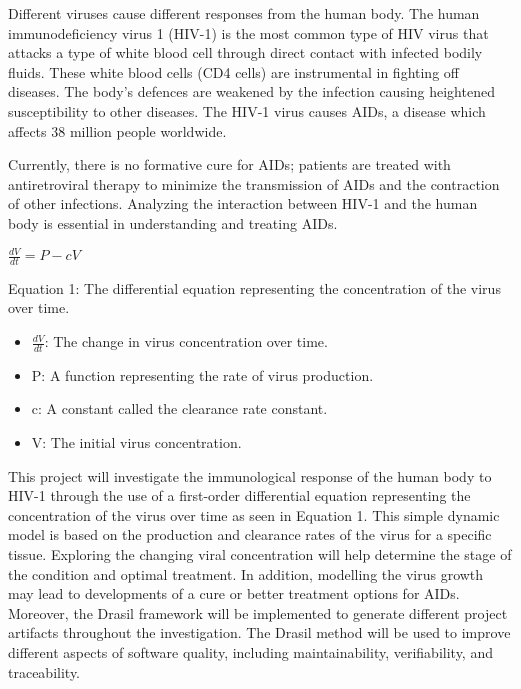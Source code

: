 \documentclass{article}
\begin{document}
Different viruses cause different responses from the human body. The human 
immunodeficiency virus 1 (HIV-1) is the most common type of HIV virus that 
attacks a type of white blood cell through direct contact with infected bodily 
fluids. These white blood cells (CD4 cells) are instrumental in fighting off 
diseases. The body’s defences are weakened by the infection causing heightened 
susceptibility to other diseases. The HIV-1 virus causes AIDs, a disease which 
affects 38 million people worldwide. 

Currently, there is no formative cure for AIDs; patients are treated with 
antiretroviral therapy to minimize the transmission of AIDs and the contraction 
of other infections. Analyzing the interaction between HIV-1 and the human body 
is essential in understanding and treating AIDs. 

\begin{center}
$\frac{dV}{dt}= P - cV$

Equation 1: The differential equation representing the concentration of the 
virus over time. 
\end{center}

\begin{itemize}
	\item $\frac{dV}{dt}$: The change in virus concentration over time. 
	\item P: A function representing the rate of virus production. 
	\item c: A constant called the clearance rate constant.
	\item V: The initial virus concentration.
\end{itemize}

This project will investigate the immunological response of the human body to 
HIV-1 through the use of a first-order differential equation representing the 
concentration of the virus over time as seen in Equation  1. This simple dynamic 
model is based on the production and clearance rates of the virus for a specific 
tissue.  Exploring the changing viral concentration will help determine the 
stage of the condition and optimal treatment. In addition, modelling the virus 
growth may lead to developments of a cure or better treatment options for AIDs. 
Moreover, the Drasil framework will be implemented to generate different project 
artifacts throughout the investigation. The Drasil method will be used to 
improve different aspects of software quality, including maintainability, 
verifiability, and traceability.

\wss{}
\amc{}
\end{document}
